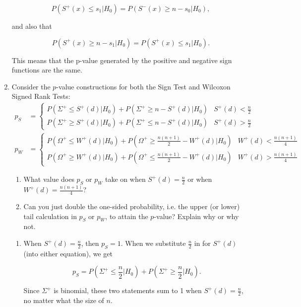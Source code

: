 \documentclass{article}
\begin{document}
\begin{enumerate}
			$$P(S^+(x) \leq s_1 | H_0) = P(S^-(x) \geq n - s_0 | H_0),$$

			and also that 

			$$P(S^+(x) \geq n - s_1 | H_0) = P(S^+(x) \leq s_1 | H_0).$$

			This means that the p-value generated by the positive and negative sign functions are the same.


			\newpage
		\item Consider the $p$-value constructions for both the Sign Test and Wilcoxon Signed Rank Tests:
			\begin{align*}
				p_S &= \left\{
					\begin{array}{cc}
						P(\Sigma^+ \leq S^{+}(d) | H_0) + P(\Sigma^+ \geq n - S^{+}(d) | H_0) & S^{+}(d) < \frac{n}{2}\\
						P(\Sigma^+ \geq S^{+}(d) | H_0) + P(\Sigma^+ \leq n - S^{+}(d) | H_0) & S^{+}(d) > \frac{n}{2}
					\end{array}\right.\\
				p_W &= \left\{
					\begin{array}{cc}
						P(\Omega^+ \leq W^{+}(d) | H_0) + P(\Omega^+ \geq \frac{n(n+1)}{2} - W^{+}(d) | H_0) & W^{+}(d) < \frac{n(n+1)}{4}\\
						P(\Omega^+ \geq W^{+}(d) | H_0) + P(\Omega^+ \leq \frac{n(n+1)}{2} - W^{+}(d) | H_0) & W^{+}(d) > \frac{n(n+1)}{4}
					\end{array}\right.
			\end{align*}
		
		\begin{enumerate}
			\item What value does $p_S$ or $p_W$ take on when $S^+(d) = \frac{n}{2}$ or when $W^+(d) = \frac{n(n+1)}{4}$?
			\item Can you just double the one-sided probability, i.e. the upper (or lower) tail calculation in $p_S$ or $p_W$, to attain the $p$-value? Explain why or why not.
		\end{enumerate}

		\begin{enumerate}
			\item When $S^+(d) = \frac{n}{2}$, then $p_S = 1$. When we substitute $\frac{n}{2}$ in for $S^+(d)$ (into either equation), we get
			
			$$p_S = P(\Sigma^+ \leq \frac{n}{2}|H_0) + P(\Sigma^+ \geq \frac{n}{2}|H_0 ) .$$

			Since $\Sigma^+$ is binomial, these two statements sum to 1 when $S^+(d) = \frac{n}{2}$, no matter what the size of $n$.


\end{enumerate}
\end{enumerate}
\end{document}
